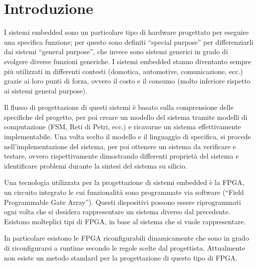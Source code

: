 \documentclass[a4paper,titlepage]{book}
\begin{document}
\begin{frontespizio}
\end{frontespizio}

\tableofcontents

\chapter{Introduzione}

I sistemi embedded sono un particolare tipo di hardware progettato per eseguire una specifica funzione; per questo sono definiti ``special purpose'' per differenziarli dai sistemi ``general purpose'', che invece sono sistemi generici in grado di svolgere diverse funzioni generiche. I sistemi embedded stanno diventanto sempre più utilizzati in differenti contesti (domotica, automotive, comunicazione, ecc.) grazie ai loro punti di forza, ovvero il costo e il consumo (molto inferiore rispetto ai sistemi general purpose).

Il flusso di progettazione di questi sistemi è basato sulla comprensione delle specifiche del progetto, per poi creare un modello del sistema tramite modelli di computazione (FSM, Reti di Petri, ecc.) e ricavarne un sistema effettivamente implementabile. Una volta scelto il modello e il linguaggio di specifica, si procede nell'implementazione del sistema, per poi ottenere un sistema da verificare e testare, ovvero rispettivamente dimostrando differenti proprietà del sistema e identificare problemi durante la sintesi del sistema su silicio.

Una tecnologia utilizzata per la progettazione di sistemi embedded è la FPGA, un circuito integrato le cui funzionalità sono programmate via software (``Field Programmable Gate Array''). Questi dispositivi possono essere riprogrammati ogni volta che si desidera rappresentare un sistema diverso dal precedente. Esistono molteplici tipi di FPGA, in base al sistema che si vuole rappresentare.

In particolare esistono le FPGA riconfigurabili dinamicamente che sono in grado di riconfigurarsi a runtime secondo le regole scelte dal progettista. Attualmente non esiste un metodo standard per la progettazione di questo tipo di FPGA.
\end{document}
